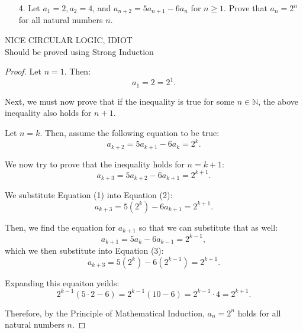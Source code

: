 \documentclass[10pt]{article}
\theoremstyle{definition}
\theoremstyle{plain}
\newcommand{\N}{\mathbb{N}}
\begin{document}
\begin{enumerate}
  \item[4.] Let $a_1 = 2, a_2 = 4$, and $a_{n+2} = 5a_{n+1} - 6a_n$ for $n \geq 1$.  Prove that $a_n = 2^n$ for all natural numbers $n$.
\end{enumerate}

\begin{center}
  \huge NICE CIRCULAR LOGIC, IDIOT \\
  \big Should be proved using Strong Induction
\end{center}
\setcounter{equation}{0}
\begin{proof}
  Let $n=1$. Then:
  $$a_1 = 2 = 2^1.$$

  \par Next, we must now prove that if the inequality is true for some $n\in\N$, the above inequality also holds for $n+1$.

  \par Let $n=k$. Then, assume the following equation to be true:
  \begin{equation}
    a_{k+2} = 5a_{k+1} - 6a_k = 2^k.
  \end{equation}

  \par We now try to prove that the inequality holds for $n=k+1$:
  \begin{equation}
    a_{k+3} = 5a_{k+2} - 6a_{k+1} = 2^{k+1}.
  \end{equation}

  \par We substitute Equation (1) into Equation (2):
  \begin{equation}
    a_{k+3} = 5(2^k) - 6a_{k+1} = 2^{k+1}.
  \end{equation}

  \par Then, we find the equation for $a_{k+1}$ so that we can substitute that as well:
  \begin{equation}
    a_{k+1} = 5a_{k} - 6a_{k-1} = 2^{k-1},
  \end{equation}
  which we then substitute into Equation (3):
  \begin{equation}
    a_{k+3} = 5(2^k) - 6(2^{k-1}) = 2^{k+1}.
  \end{equation}

  \par Expanding this equaiton yeilds:
  \begin{equation}
    2^{k-1} (5\cdot 2 - 6) = 2^{k-1} (10 - 6) = 2^{k-1}\cdot 4 = 2^{k+1}.
  \end{equation}

  \par Therefore, by the Principle of Mathematical Induction, $a_n = 2^n$ holds for all natural numbers $n$.
\end{proof}
\end{document}
